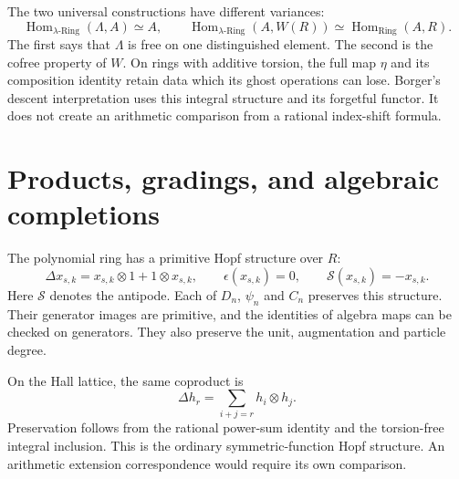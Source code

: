 The two universal constructions have different variances:
\[
 \operatorname{Hom}_{\lambda\text{-}\mathrm{Ring}}(\Lambda,A)
 \simeq A,
 \qquad
 \operatorname{Hom}_{\lambda\text{-}\mathrm{Ring}}(A,W(R))
 \simeq\operatorname{Hom}_{\mathrm{Ring}}(A,R).
\]
The first says that $\Lambda$ is free on one distinguished element.
The second is the cofree property of $W$.
On rings with additive torsion, the full map $\eta$ and its
composition identity retain data which its ghost operations can lose.
Borger's descent interpretation uses this integral structure and its
forgetful functor. It does not create an arithmetic comparison from
a rational index-shift formula.

\section{Products, gradings, and algebraic completions}
\label{v4-arith:hecke:sec:structures}

The polynomial ring has a primitive Hopf structure over $R$:
\[
 \Delta x_{s,k}=x_{s,k}\otimes1+1\otimes x_{s,k},\qquad
 \epsilon(x_{s,k})=0,\qquad \mathcal S(x_{s,k})=-x_{s,k}.
\]
Here $\mathcal S$ denotes the antipode.
Each of $D_n$, $\psi_n$ and $C_n$ preserves this structure.
Their generator images are primitive, and the identities of algebra
maps can be checked on generators.
They also preserve the unit, augmentation and particle degree.

On the Hall lattice, the same coproduct is
\[
 \Delta h_r=\sum_{i+j=r}h_i\otimes h_j.
\]
Preservation follows from the rational power-sum identity and the
torsion-free integral inclusion.
This is the ordinary symmetric-function Hopf structure.
An arithmetic extension correspondence would require its own comparison.

